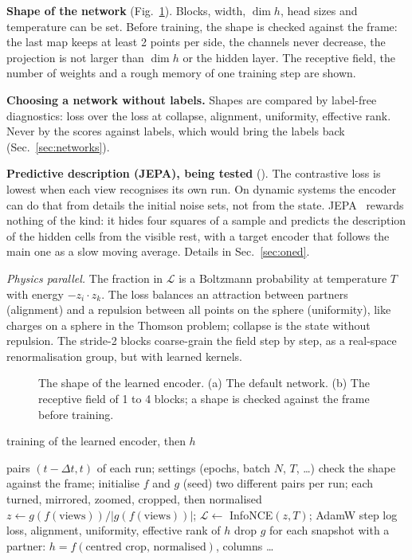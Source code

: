 \documentclass[11pt,a4paper]{article}
\newcommand{\repo}{https://github.com/Lu-Dumoulin/PhaseWall}
\newcommand{\srcref}[1]{\href{\repo/blob/main/#1}{\texttt{\detokenize{#1}}}}
\newcommand{\code}[1]{\texttt{\detokenize{#1}}}
\begin{document}
\begin{tech}
\textbf{Shape of the network} (Fig.~\ref{fig:network}). Blocks, width, $\dim h$, head sizes and temperature can
be set. Before training, the shape is checked against the frame: the last map keeps at least 2 points per side,
the channels never decrease, the projection is not larger than $\dim h$ or the hidden layer. The receptive field,
the number of weights and a rough memory of one training step are shown.

\textbf{Choosing a network without labels.} Shapes are compared by label-free diagnostics: loss over the loss at
collapse, alignment, uniformity, effective rank. Never by the scores against labels, which would bring the labels
back (Sec.~\ref{sec:networks}).

\textbf{Predictive description (JEPA), being tested} (\srcref{src/phasewall/nn/jepa.py}). The contrastive loss
is lowest when each view recognises its own run. On dynamic systems the encoder can do that from details the
initial noise sets, not from the state. JEPA~\cite{assran2023,bardes2024} rewards nothing of the kind: it hides
four squares of a sample and predicts the description of the hidden cells from the visible rest, with a target
encoder that follows the main one as a slow moving average. Details in Sec.~\ref{sec:oned}.

\emph{Physics parallel.} The fraction in $\mathcal L$ is a Boltzmann probability at temperature $T$ with energy
$-z_i\cdot z_k$. The loss balances an attraction between partners (alignment) and a repulsion between all points
on the sphere (uniformity), like charges on a sphere in the Thomson problem; collapse is the state without
repulsion. The stride-2 blocks coarse-grain the field step by step, as a real-space renormalisation group, but
with learned kernels.
\end{tech}

\begin{figure}[H]
\centering

\caption{The shape of the learned encoder. (a) The default network. (b) The receptive field of 1 to 4 blocks;
a shape is checked against the frame before training.}\label{fig:network}
\end{figure}

\begin{algobox}{training of the learned encoder, then $h$}
\begin{algorithmic}[1]
\Require pairs $(t-\Delta t,t)$ of each run; settings (epochs, batch $N$, $T$, \ldots)
\State check the shape against the frame; initialise $f$ and $g$ (seed)
    \State two different pairs per run; each turned, mirrored, zoomed, cropped, then normalised
    \State $z\gets g(f(\text{views}))/|g(f(\text{views}))|$; $\mathcal L\gets$ InfoNCE$(z,T)$; AdamW step
  \EndFor
  \State log loss, alignment, uniformity, effective rank of $h$
\EndFor
\State drop $g$
\Ensure for each snapshot with a partner: $h=f(\text{centred crop, normalised})$, columns \code{cnn.h.d000}\ldots\code{d255}
\end{algorithmic}
\end{algobox}
\end{document}
